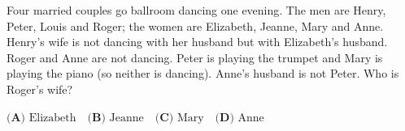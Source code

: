 Four married couples go ballroom dancing one evening. The men are Henry, Peter, Louis and Roger; the women are Elizabeth, Jeanne, Mary and Anne. Henry's wife is not dancing with her husband but with Elizabeth's husband. Roger and Anne are not dancing. Peter is playing the trumpet and Mary is playing the piano (so neither is dancing). Anne's husband is not Peter. Who is Roger's wife?

$\textbf{(A) } \text{Elizabeth} \quad\textbf{(B) }\text{Jeanne}\quad\textbf{(C) }\text{Mary}\quad\textbf{(D) }\text{Anne}$
